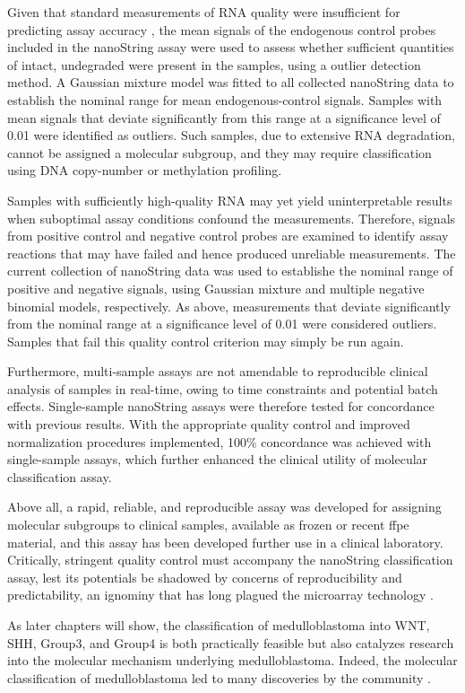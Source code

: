 Given that standard measurements of RNA quality were insufficient for predicting assay accuracy , the mean signals of the endogenous control probes included in the nanoString assay were used to assess whether sufficient quantities of intact, undegraded were present in the samples, using a outlier detection method. A Gaussian mixture model was fitted to all collected nanoString data to establish the nominal range for mean endogenous-control signals. Samples with mean signals that deviate significantly from this range at a significance level of 0.01 were identified as outliers. Such samples, due to extensive RNA degradation, cannot be assigned a molecular subgroup, and they may require classification using DNA copy-number or methylation profiling.

Samples with sufficiently high-quality RNA may yet yield uninterpretable results when suboptimal assay conditions confound the measurements. Therefore, signals from positive control and negative control probes are examined to identify assay reactions that may have failed and hence produced unreliable measurements. The current collection of nanoString data was used to establishe the nominal range of positive and negative signals, using Gaussian mixture and multiple negative binomial models, respectively. As above, measurements that deviate significantly from the nominal range at a significance level of 0.01 were considered outliers. Samples that fail this quality control criterion may simply be run again.

Furthermore, multi-sample assays are not amendable to reproducible clinical analysis of samples in real-time, owing to time constraints and potential batch effects. Single-sample nanoString assays were therefore tested for concordance with previous results. With the appropriate quality control and improved normalization procedures implemented, 100\% concordance was achieved with single-sample assays, which further enhanced the clinical utility of molecular classification assay.



Above all, a rapid, reliable, and reproducible assay was developed for assigning molecular subgroups to clinical samples, available as frozen or recent \gls{ffpe} material, and this assay has been developed further use in a clinical laboratory. Critically, stringent quality control must accompany the nanoString classification assay, lest its potentials be shadowed by concerns of reproducibility and predictability, an ignominy that has long plagued the microarray technology .

As later chapters will show, the classification of medulloblastoma into WNT, SHH, Group3, and Group4 is both practically feasible but also catalyzes research into the molecular mechanism underlying medulloblastoma. Indeed, the molecular classification of medulloblastoma led to many discoveries by the community .


\clearpage
